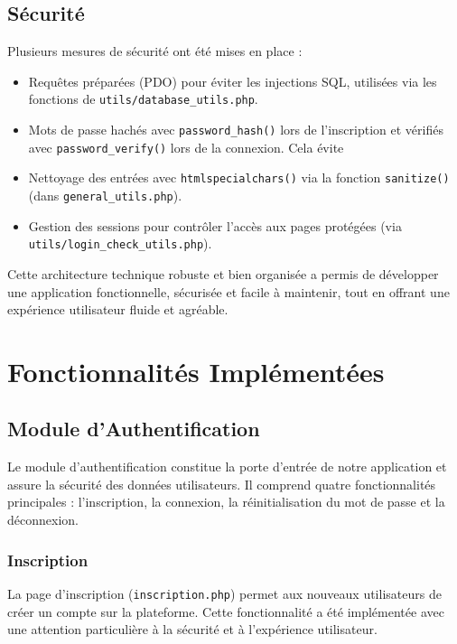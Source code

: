 \documentclass[a4paper,12pt]{article}
\begin{document}
\subsection{Sécurité}
Plusieurs mesures de sécurité ont été mises en place :
\begin{itemize}
    \item Requêtes préparées (PDO) pour éviter les injections SQL, utilisées via les fonctions de \texttt{utils/database\_utils.php}.
    \item Mots de passe hachés avec \texttt{password\_hash()} lors de l'inscription et vérifiés avec \texttt{password\_verify()} lors de la connexion. Cela évite
    \item Nettoyage des entrées avec \texttt{htmlspecialchars()} via la fonction \texttt{sanitize()} (dans \texttt{general\_utils.php}).
    \item Gestion des sessions pour contrôler l'accès aux pages protégées (via \texttt{utils/login\_check\_utils.php}).
\end{itemize}

Cette architecture technique robuste et bien organisée a permis de développer une application fonctionnelle, sécurisée et facile à maintenir, tout en offrant une expérience utilisateur fluide et agréable.

\section{Fonctionnalités Implémentées}

\subsection{Module d'Authentification}

Le module d'authentification constitue la porte d'entrée de notre application et assure la sécurité des données utilisateurs.
Il comprend quatre fonctionnalités principales : l'inscription, la connexion, la réinitialisation du mot de passe et la déconnexion.

\subsubsection{Inscription}

La page d'inscription (\texttt{inscription.php}) permet aux nouveaux utilisateurs de créer un compte sur la plateforme.
Cette fonctionnalité a été implémentée avec une attention particulière à la sécurité et à l'expérience utilisateur.
\end{document}
